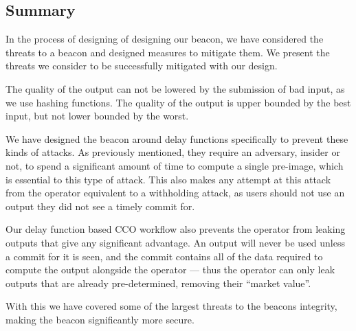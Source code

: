 \subsection{Summary}
In the process of designing of designing our beacon, we have considered the threats to a beacon and designed measures to mitigate them. We present the threats we consider to be successfully mitigated with our design.

The quality of the output can not be lowered by the submission of bad input, as we use hashing functions. The quality of the output is upper bounded by the best input, but not lower bounded by the worst.

We have designed the beacon around delay functions specifically to prevent these kinds of attacks. As previously mentioned, they require an adversary, insider or not, to spend a significant amount of time to compute a single pre-image, which is essential to this type of attack.
This also makes any attempt at this attack from the operator equivalent to a withholding attack, as users should not use an output they did not see a timely commit for.

Our delay function based CCO workflow also prevents the operator from leaking outputs that give any significant advantage. An output will never be used unless a commit for it is seen, and the commit contains all of the data required to compute the output alongside the operator --- thus the operator can only leak outputs that are already pre-determined, removing their \enquote{market value}.

With this we have covered some of the largest threats to the beacons integrity, making the beacon significantly more secure.


